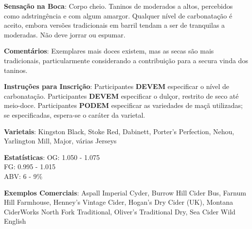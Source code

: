 \textbf{Sensação na Boca}: Corpo cheio. Taninos de moderados a altos, percebidos como adstringência e com algum amargor. Qualquer nível de carbonatação é aceito, embora versões tradicionais em barril tendam a ser de tranquilas a moderadas. Não deve jorrar ou espumar.

\textbf{Comentários}: Exemplares mais doces existem, mas as secas são mais tradicionais, particularmente considerando a contribuição para a secura vinda dos taninos.

\textbf{Instruções para Inscrição}: Participantes \textbf{DEVEM} especificar o nível de carbonatação. Participantes \textbf{DEVEM} especificar o dulçor, restrito de seco até meio-doce. Participantes \textbf{PODEM} especificar as variedades de maçã utilizadas; se especificadas, espera-se o caráter da varietal.

\textbf{Varietais}: Kingston Black, Stoke Red, Dabinett, Porter's Perfection, Nehou, Yarlington Mill, Major, várias Jerseys

\textbf{Estatísticas}: OG: 1.050 - 1.075 \\
\phantom{ } \hspace{16.5mm} FG: 0.995 - 1.015 \\
\phantom{ } \hspace{16.5mm} ABV: 6 - 9\%

\textbf{Exemplos Comerciais}: Aspall Imperial Cyder, Burrow Hill Cider Bus, Farnum Hill Farmhouse, Henney's Vintage Cider, Hogan's Dry Cider (UK), Montana CiderWorks North Fork Traditional, Oliver's Traditional Dry, Sea Cider Wild English
